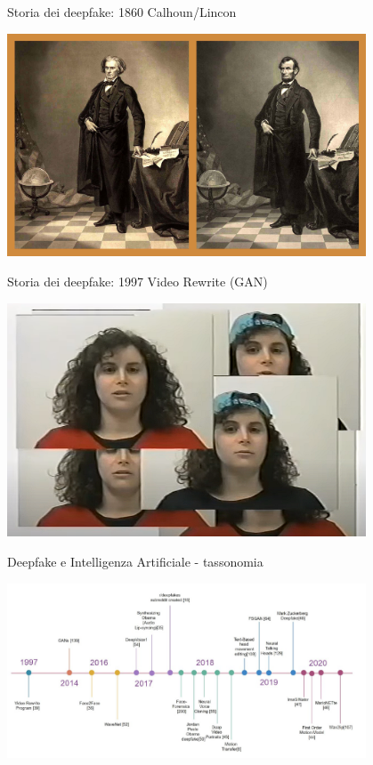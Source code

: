 \documentclass[11pt]{beamer}
\begin{document}
\begin{frame}{Storia dei deepfake: 1860 Calhoun/Lincon \cite{ng}}

\begin{center}
\includegraphics[width=0.8\textwidth]{Pic/Licon_deepfake.jpg}
\end{center}

\end{frame}


\begin{frame}{Storia dei deepfake: 1997 Video Rewrite (GAN) \cite{video_rewrite}}

\begin{center}
\includegraphics[width=0.8\textwidth]{Pic/video_rewrite.png}
\end{center}

\end{frame}


\begin{frame}{Deepfake e Intelligenza Artificiale - tassonomia \cite{masood2023deepfakes}}

\begin{center}
\includegraphics[width=0.8\textwidth]{Pic/timeline_deepfakes.png}
\end{center}

\end{frame}
\end{document}
